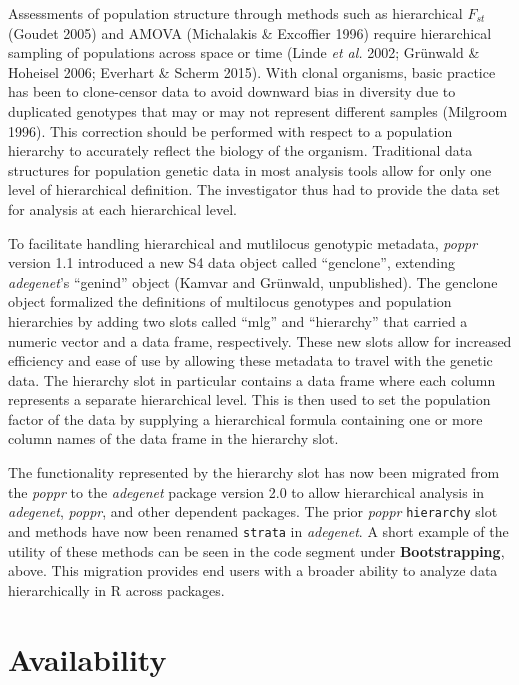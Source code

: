 \documentclass[double,12pt]{beavtex}
\begin{document}
  Assessments of population structure through methods such as hierarchical
  \(F_{st}\) (Goudet 2005) and AMOVA (Michalakis \& Excoffier 1996)
  require hierarchical sampling of populations across space or time (Linde
  \emph{et al.} 2002; Grünwald \& Hoheisel 2006; Everhart \& Scherm 2015).
  With clonal organisms, basic practice has been to clone-censor data to
  avoid downward bias in diversity due to duplicated genotypes that may or
  may not represent different samples (Milgroom 1996). This correction
  should be performed with respect to a population hierarchy to accurately
  reflect the biology of the organism. Traditional data structures for
  population genetic data in most analysis tools allow for only one level
  of hierarchical definition. The investigator thus had to provide the
  data set for analysis at each hierarchical level.
  
  To facilitate handling hierarchical and mutlilocus genotypic metadata,
  \emph{poppr} version 1.1 introduced a new S4 data object called
  ``genclone'', extending \emph{adegenet}'s ``genind'' object (Kamvar and
  Grünwald, unpublished). The genclone object formalized the definitions
  of multilocus genotypes and population hierarchies by adding two slots
  called ``mlg'' and ``hierarchy'' that carried a numeric vector and a
  data frame, respectively. These new slots allow for increased efficiency
  and ease of use by allowing these metadata to travel with the genetic
  data. The hierarchy slot in particular contains a data frame where each
  column represents a separate hierarchical level. This is then used to
  set the population factor of the data by supplying a hierarchical
  formula containing one or more column names of the data frame in the
  hierarchy slot.
  
  The functionality represented by the hierarchy slot has now been
  migrated from the \emph{poppr} to the \emph{adegenet} package version
  2.0 to allow hierarchical analysis in \emph{adegenet}, \emph{poppr}, and
  other dependent packages. The prior \emph{poppr} \texttt{hierarchy} slot
  and methods have now been renamed \texttt{strata} in \emph{adegenet}. A
  short example of the utility of these methods can be seen in the code
  segment under \textbf{Bootstrapping}, above. This migration provides end
  users with a broader ability to analyze data hierarchically in R across
  packages.
  
  \section{Availability}\label{availability}
  
\end{document}
